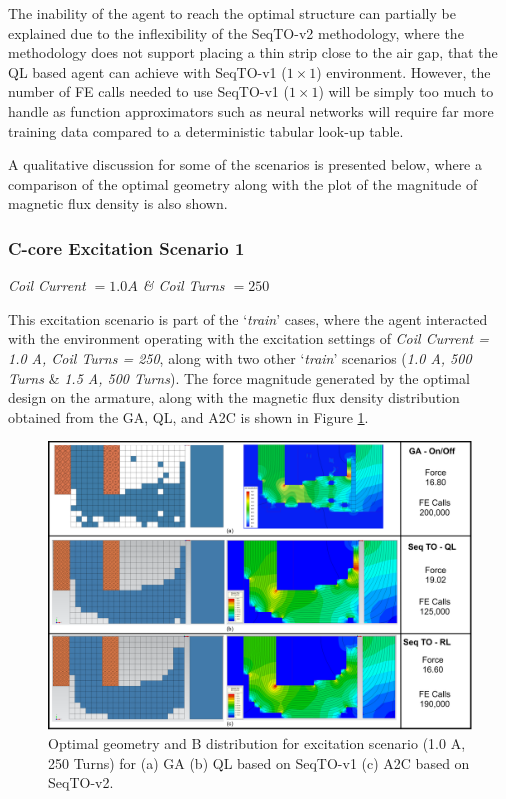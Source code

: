 The inability of the agent to reach the optimal structure can partially be explained due to the inflexibility of the SeqTO-v2 methodology, where the methodology does not support placing a thin strip close to the air gap, that the QL based agent can achieve with SeqTO-v1 ($1 \times 1$) environment. However, the number of FE calls needed to use SeqTO-v1 ($1 \times 1$) will be simply too much to handle as function approximators such as neural networks will require far more training data compared to a deterministic tabular look-up table.

A qualitative discussion for some of the scenarios is presented below, where a comparison of the optimal geometry along with the plot of the magnitude of magnetic flux density is also shown.

\subsubsection{C-core Excitation Scenario 1}
\label{section:RL_c_core_excitation_1A_250T}
\textit{Coil Current $= 1.0 A$  \& Coil Turns $= 250$ }

This excitation scenario is part of the `\textit{train}’ cases, where the agent interacted with the environment operating with the excitation settings of \textit{Coil Current = 1.0 A, Coil Turns = 250}, along with two other `\textit{train}' scenarios (\textit{1.0 A, 500 Turns} \& \textit{1.5 A, 500 Turns}). The force magnitude generated by the optimal design on the armature, along with the magnetic flux density distribution obtained from the GA, QL, and A2C is shown in Figure \ref{fig:RL_Ccore_0.5A_GeoNB}. 

\begin{figure}[h!]
    \centering
    \includegraphics[width=\textwidth]{Figures/Ch_RL/Ccore_0.5A.png}
    \caption{Optimal geometry and B distribution for excitation scenario (1.0 A, 250 Turns) for (a) GA (b) QL based on SeqTO-v1 (c) A2C based on SeqTO-v2.}
    \label{fig:RL_Ccore_0.5A_GeoNB}
\end{figure}

